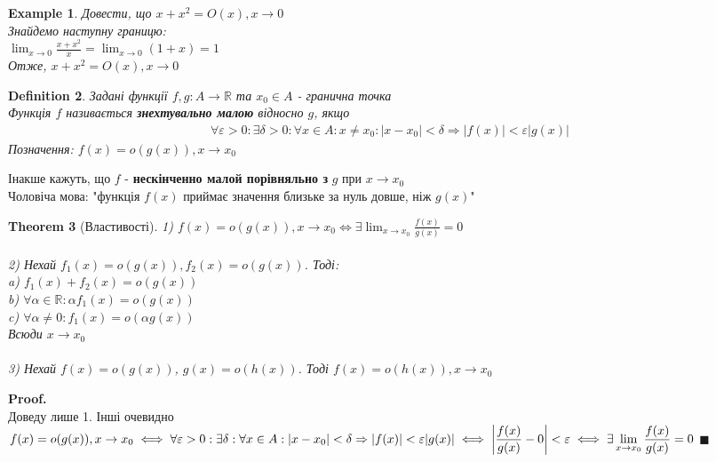 \documentclass[a4paper, 14pt]{extarticle}
\def\huge{\displaystyle}
\def\bigline{\vspace{5mm}\\}
\theoremstyle{theoremdd}
\newtheorem{theorem}{Theorem}[subsection]
\theoremstyle{theoremdd}
\newtheorem{definition}[theorem]{Definition}
\theoremstyle{theoremdd}
\theoremstyle{theoremdd}
\newtheorem{example}[theorem]{Example}
\theoremstyle{theoremdd}
\theoremstyle{theoremdd}
\theoremstyle{theoremdd}
\theoremstyle{theoremdd}
\newenvironment{pf}{\vspace*{-3mm} \textbf{Proof. \\}}{$\blacksquare$}
\begin{document}
\begin{example}
Довести, що $x+x^2 = O(x), x \to 0$\\
Знайдемо наступну границю:\\
$\huge \lim_{x \to 0} \frac{x+x^2}{x} = \lim_{x \to 0}(1+x) = 1$\\
Отже, $x+x^2 = O(x), x \to 0$
\end{example}

\begin{definition}
Задані функції $f,g: A \to \mathbb{R}$ та $x_0 \in A$ - гранична точка\\
Функція $f$ називається \textbf{знехтувально малою} відносно $g$, якщо
\begin{align*}
\forall \varepsilon>0: \exists \delta > 0: \forall x \in A: x \neq x_0: |x-x_0| < \delta \Rightarrow |f(x)| < \varepsilon |g(x)|
\end{align*}
Позначення: $f(x) = o(g(x)), x \to x_0$
\end{definition}
Інакше кажуть, що $f$ - \textbf{нескінченно малой порівняльно з} $g$ при $x \to x_0$\\
Чоловіча мова: "функція $f(x)$ приймає значення близьке за нуль довше, ніж $g(x)$"
\bigline

\begin{theorem}[Властивості]
1) $f(x) = o(g(x)), x \to x_0 \iff \huge \exists \lim_{x \to x_0} \frac{f(x)}{g(x)} = 0$\\
\\
2) Нехай $f_1(x) = o(g(x)), f_2(x) = o(g(x))$. Тоді:\\
a) $f_1(x) + f_2(x) = o(g(x))$\\
b) $\forall \alpha \in \mathbb{R}: \alpha f_1(x) = o(g(x))$\\
c) $\forall \alpha \neq 0: f_1(x) = o(\alpha g(x))$\\
Всюди $x \to x_0$\\
\\
3) Нехай $f(x) = o(g(x))$, $g(x) = o(h(x))$. Тоді $f(x) = o(h(x)), x \to x_0$
\end{theorem}

\begin{pf}
Доведу лише 1. Інші очевидно\\
$f(x) = o(g(x)),x \to x_0 \iff \forall \varepsilon>0: \exists \delta: \forall x \in A: |x-x_0| < \delta \Rightarrow |f(x)| < \varepsilon |g(x)| \iff \huge \abs{\frac{f(x)}{g(x)} - 0} < \varepsilon \iff \exists \lim_{x \to x_0} \frac{f(x)}{g(x)} = 0$
\end{pf}
\end{document}
